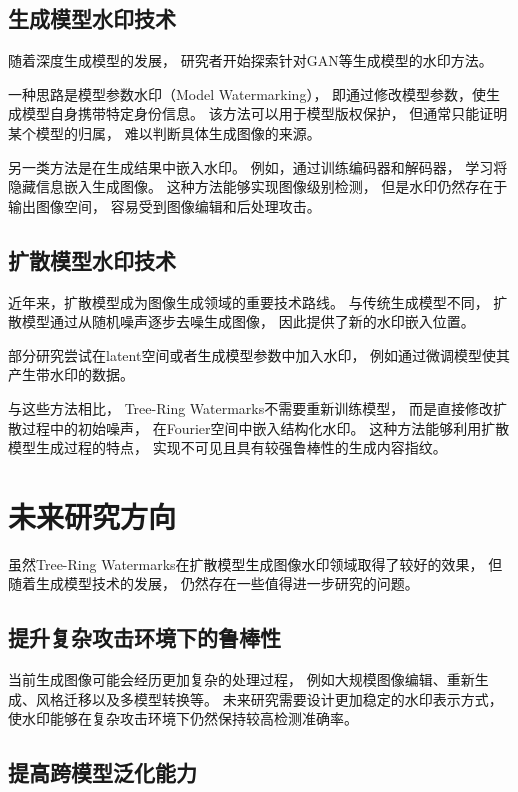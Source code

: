 \documentclass[12pt,a4paper]{article}
\begin{document}
\subsection{生成模型水印技术}

随着深度生成模型的发展，
研究者开始探索针对GAN等生成模型的水印方法。

一种思路是模型参数水印（Model Watermarking），
即通过修改模型参数，使生成模型自身携带特定身份信息。
该方法可以用于模型版权保护，
但通常只能证明某个模型的归属，
难以判断具体生成图像的来源。


另一类方法是在生成结果中嵌入水印。
例如，通过训练编码器和解码器，
学习将隐藏信息嵌入生成图像。
这种方法能够实现图像级别检测，
但是水印仍然存在于输出图像空间，
容易受到图像编辑和后处理攻击。


\subsection{扩散模型水印技术}

近年来，扩散模型成为图像生成领域的重要技术路线。
与传统生成模型不同，
扩散模型通过从随机噪声逐步去噪生成图像，
因此提供了新的水印嵌入位置。

部分研究尝试在latent空间或者生成模型参数中加入水印，
例如通过微调模型使其产生带水印的数据。

与这些方法相比，
Tree-Ring Watermarks不需要重新训练模型，
而是直接修改扩散过程中的初始噪声，
在Fourier空间中嵌入结构化水印。
这种方法能够利用扩散模型生成过程的特点，
实现不可见且具有较强鲁棒性的生成内容指纹。 


\section{未来研究方向}

虽然Tree-Ring Watermarks在扩散模型生成图像水印领域取得了较好的效果，
但随着生成模型技术的发展，
仍然存在一些值得进一步研究的问题。


\subsection{提升复杂攻击环境下的鲁棒性}

当前生成图像可能会经历更加复杂的处理过程，
例如大规模图像编辑、重新生成、风格迁移以及多模型转换等。
未来研究需要设计更加稳定的水印表示方式，
使水印能够在复杂攻击环境下仍然保持较高检测准确率。


\subsection{提高跨模型泛化能力}
\end{document}
